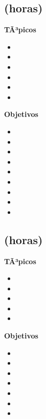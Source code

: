 \subsection{\OSCINCODef  (\OSCINCOHours horas)}\label{sec:BOK-OS5}

\textbf{TÃ³picos}
\begin{itemize}
	\item \OSCINCOTopicRevision
	\item \OSCINCOTopicRetardos
	\item \OSCINCOTopicPaginamiento
	\item \OSCINCOTopicPoliticas
	\item \OSCINCOTopicConjuntos
	\item \OSCINCOTopicCaching
\end{itemize}

\textbf{Objetivos}
\begin{itemize}
	\item \OSCINCOObjUNO
	\item \OSCINCOObjDOS
	\item \OSCINCOObjTRES
	\item \OSCINCOObjCUATRO
	\item \OSCINCOObjCINCO
	\item \OSCINCOObjSEIS
	\item \OSCINCOObjSIETE
	\item \OSCINCOObjOCHO
	\item \OSCINCOObjNUEVE
\end{itemize}

\subsection{\OSSEISDef  (\OSSEISHours horas)}\label{sec:BOK-OS6}

\textbf{TÃ³picos}
\begin{itemize}
	\item \OSSEISTopicCaracteristicas
	\item \OSSEISTopicDiferencias
	\item \OSSEISTopicEstrategias
	\item \OSSEISTopicAcceso
	\item \OSSEISTopicRecuperacion
\end{itemize}

\textbf{Objetivos}
\begin{itemize}
	\item \OSSEISObjUNO
	\item \OSSEISObjDOS
	\item \OSSEISObjTRES
	\item \OSSEISObjCUATRO
	\item \OSSEISObjCINCO
	\item \OSSEISObjSEIS
	\item \OSSEISObjSIETE
\end{itemize}

